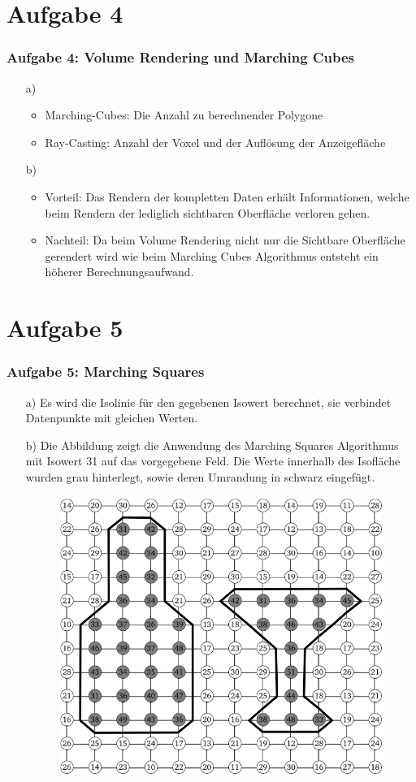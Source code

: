 \documentclass[accentcolor=tud9c,colorbacktitle,inverttitle,landscape,german,presentation,t]{tudbeamer}
\begin{document}
\section{Aufgabe 4}
\begin{frame}
	\frametitle{Aufgabe 4: Volume Rendering und Marching Cubes}
	\begin{itemize}
	\item[a)]
		\begin{itemize}
			\item Marching-Cubes: Die Anzahl zu berechnender Polygone \\
			\item Ray-Casting: Anzahl der Voxel und der Auflösung der Anzeigefläche
		\end{itemize}
	\item[b)] %
	\begin{itemize}
		\item Vorteil: Das Rendern der kompletten Daten erhält Informationen, welche beim Rendern der lediglich sichtbaren Oberfläche verloren gehen. \\
		\item Nachteil: Da beim Volume Rendering nicht nur die Sichtbare Oberfläche gerendert wird wie beim Marching Cubes Algorithmus entsteht ein höherer Berechnungsaufwand.
	\end{itemize}
	\end{itemize}
\end{frame}

\section{Aufgabe 5}
\begin{frame}
	\frametitle{Aufgabe 5: Marching Squares}
	\begin{itemize}
		\item[a)] Es wird die Isolinie für den gegebenen Isowert berechnet, sie verbindet Datenpunkte mit gleichen Werten.
		\item[b)]
		Die Abbildung zeigt die Anwendung des Marching Squares Algorithmus mit Isowert 31 auf das vorgegebene Feld. Die Werte innerhalb des Isofläche wurden grau hinterlegt, sowie deren Umrandung in schwarz eingefügt.
		\begin{figure}
			\includegraphics[width = .4\linewidth]{task_5b.png}
			\label{MaSq}
		\end{figure}
	\end{itemize}
\end{frame}
\end{document}
